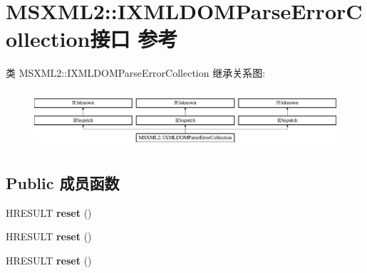 \hypertarget{interface_m_s_x_m_l2_1_1_i_x_m_l_d_o_m_parse_error_collection}{}\section{M\+S\+X\+M\+L2\+:\+:I\+X\+M\+L\+D\+O\+M\+Parse\+Error\+Collection接口 参考}
\label{interface_m_s_x_m_l2_1_1_i_x_m_l_d_o_m_parse_error_collection}
类 M\+S\+X\+M\+L2\+:\+:I\+X\+M\+L\+D\+O\+M\+Parse\+Error\+Collection 继承关系图\+:\begin{figure}[H]
\begin{center}
\leavevmode
\includegraphics[height=2.170543cm]{interface_m_s_x_m_l2_1_1_i_x_m_l_d_o_m_parse_error_collection}
\end{center}
\end{figure}
\subsection*{Public 成员函数}
\begin{DoxyCompactItemize}
\item 
\mbox{\label{interface_m_s_x_m_l2_1_1_i_x_m_l_d_o_m_parse_error_collection_a8b3ba2c06c06fe1ac28f10888e03b725}} 
H\+R\+E\+S\+U\+LT {\bfseries reset} ()
\item 
\mbox{\label{interface_m_s_x_m_l2_1_1_i_x_m_l_d_o_m_parse_error_collection_a8b3ba2c06c06fe1ac28f10888e03b725}} 
H\+R\+E\+S\+U\+LT {\bfseries reset} ()
\item 
\mbox{\label{interface_m_s_x_m_l2_1_1_i_x_m_l_d_o_m_parse_error_collection_a8b3ba2c06c06fe1ac28f10888e03b725}} 
H\+R\+E\+S\+U\+LT {\bfseries reset} ()
\end{DoxyCompactItemize}
